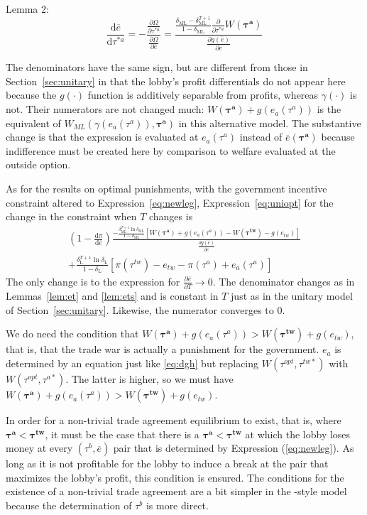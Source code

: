 \documentclass[authoryear, review]{elsarticle}
\newcommand{\ov}{\overline}
\newcommand{\bta}{\bm{\tau^a}}
\newcommand{\ga}{\gamma}
\newcommand{\btw}{\bm{\tau^{tw}}}
\newcommand{\de}{\delta}
\begin{document}
Lemma 2:
	\begin{equation*}
		\frac{\mathrm{d} \ov{e}}{\mathrm{d} \tau^{*a}} = -\frac{\frac{\partial \Omega}{\partial \tau^{*a}}}{\frac{\partial \Omega}{\partial \ov{e}}} =
	\textstyle \frac{\frac{\de_\text{ML} - \de_\text{ML}^{T+1}}{1-\de_\text{ML}}  \frac{\partial}{\partial \tau^{*a}}W(\bta)}{\frac{\partial g(\ov{e})}{\partial e} }
	\end{equation*}
							
The denominators have the same sign, but are different from those in Section~\ref{sec:unitary} in that the lobby's profit differentials do not appear here because the $g(\cdot)$ function is additively separable from profits, whereas $\ga(\cdot)$ is not. Their numerators are not changed much: $W(\bta) + g(e_a(\tau^a))$ is the equivalent of $W_{ML}(\ga(e_a(\tau^a)),\bta)$ in this alternative model. The substantive change is that the expression is evaluated at $e_a(\tau^a)$ instead of $\ov{e}(\bta)$ because indifference must be created here by comparison to welfare evaluated at the outside option. 

As for the results on optimal punishments, with the government incentive constraint altered to Expression~\ref{eq:newleg}, Expression~\ref{eq:uniopt} for the change in the constraint when $T$ changes is 
	\begin{multline}
		\left(1 - \frac{\mathrm{d} \pi}{\mathrm{d} \ov{e}} \right) \frac{ -\frac{\de_\text{ML}^{T+1}\ln\de_\text{ML}}{1-\de_\text{ML}}\left[  W(\bta) +g(e_a(\tau^a)) - W(\btw) - g(e_{tw}) \right]}{ \frac{\partial g(\ov{e})}{\partial e} } \\
	+  \frac{\de_\text{L}^{T+1} \ln \de_\text{L}}{1-\de_\text{L}} \left[ \pi(\tau^{tw}) - e_{tw} -\pi(\tau^a) + e_a(\tau^a) \right]
	\end{multline}
The only change is to the expression for $\frac{\partial \ov{e}}{\partial T} \rightarrow 0$. The denominator changes as in Lemmas~\ref{lem:et} and \ref{lem:ets} and is constant in $T$ just as in the unitary model of Section~\ref{sec:unitary}. Likewise, the numerator converges to $0$.

We do need the condition that $W(\bta) +g(e_a(\tau^a)) > W(\btw) + g(e_{tw})$, that is, that the trade war is actually a punishment for the government. $e_a$ is determined by an equation just like \ref{eq:dgh} but replacing $W(\tau^{opt},\tau^{tw*})$ with $W(\tau^{opt},\tau^{a*})$. The latter is higher, so we must have $W(\bta) +g(e_a(\tau^a)) > W(\btw) + g(e_{tw})$.

In order for a non-trivial trade agreement equilibrium to exist, that is, where $\bta < \btw$, it must be the case that there is a $\bta < \btw$ at which the lobby loses money at every $\left(\tau^b,\ov{e}\right)$ pair that is determined by Expression (\ref{eq:newleg}). As long as it is not profitable for the lobby to induce a break at the pair that maximizes the lobby's profit, this condition is ensured. The conditions for the existence of a non-trivial trade agreement are a bit simpler in the \citet{dgh97}-style model because the determination of $\tau^b$ is more direct.
\end{document}
